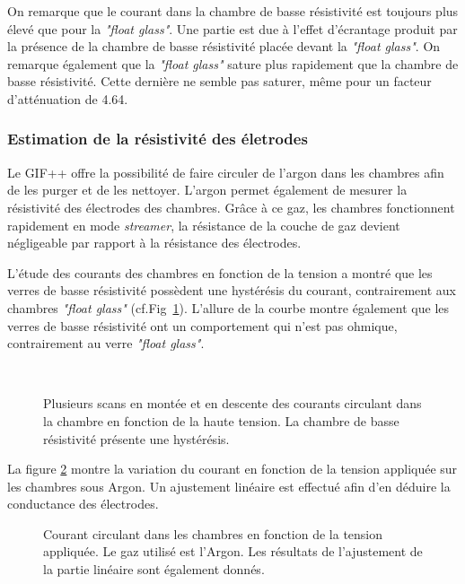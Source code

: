 On remarque que le courant dans la chambre de basse résistivité est toujours plus élevé que pour la \textit{"float glass"}. Une partie est due à l'effet d'écrantage produit par la présence de la chambre de basse résistivité placée devant la \textit{"float glass"}. On remarque également que la \textit{"float glass"} sature plus rapidement que la chambre de basse résistivité. Cette dernière ne semble pas saturer, même pour un facteur d'atténuation de \num{4.64}.

\subsubsection{Estimation de la résistivité des életrodes}

Le GIF++ offre la possibilité de faire circuler de l'argon dans les chambres afin de les purger et de les nettoyer. L'argon permet également de mesurer la résistivité des électrodes des chambres. Grâce à ce gaz, les chambres fonctionnent rapidement en mode \textit{streamer}, la résistance de la couche de gaz devient négligeable  par rapport à la résistance des électrodes. 

L'étude des courants des chambres en fonction de la tension a montré que les verres de basse résistivité possèdent une hystérésis du courant, contrairement aux chambres \textit{"float glass"} (cf.Fig~\ref{hysteresis}). L'allure de la courbe montre également que les verres de basse résistivité ont un comportement qui n'est pas ohmique, contrairement au verre \textit{"float glass"}.


\begin{figure}[ht!]
	\centering
	\\
	\caption{Plusieurs scans en montée et en descente  des courants circulant dans la chambre en fonction de la haute tension. La chambre de basse résistivité présente une hystérésis.}
	\label{hysteresis}
\end{figure}


La figure \ref{ScanArgon} montre la variation du courant en fonction de la tension appliquée sur les chambres sous Argon. Un ajustement linéaire est effectué afin d'en déduire la conductance des électrodes.

\begin{figure}[!ht]
	\centering
	\caption{Courant circulant dans les chambres en fonction de la tension appliquée. Le gaz utilisé est l'Argon. Les résultats de l'ajustement de la partie linéaire sont également donnés.}
	\label{ScanArgon}
\end{figure}

